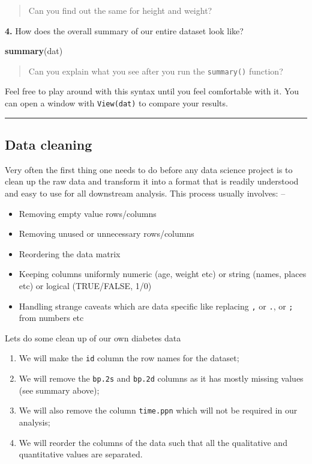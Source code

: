 \documentclass[
]{book}
\newenvironment{Shaded}{\begin{snugshade}}{\end{snugshade}}
\newcommand{\FunctionTok}[1]{\textcolor[rgb]{0.13,0.29,0.53}{\textbf{#1}}}
\newcommand{\NormalTok}[1]{#1}
\providecommand{\tightlist}{%
  \setlength{\itemsep}{0pt}\setlength{\parskip}{0pt}}
\begin{document}
\begin{quote}
Can you find out the same for height and weight?
\end{quote}

\textbf{4.} How does the overall summary of our entire dataset look like?

\begin{Shaded}
\begin{Highlighting}[]
\FunctionTok{summary}\NormalTok{(dat)}
\end{Highlighting}
\end{Shaded}

\begin{quote}
Can you explain what you see after you run the \texttt{summary()} function?
\end{quote}

Feel free to play around with this syntax until you feel comfortable with it.
You can open a window with \texttt{View(dat)} to compare your results.

\begin{center}\rule{0.5\linewidth}{0.5pt}\end{center}

\hypertarget{data-cleaning}{%
\subsection{Data cleaning}\label{data-cleaning}}

Very often the first thing one needs to do before any data science project is to clean up the raw data and transform it into a format that is readily understood and easy to use for all downstream analysis.
This process usually involves: --

\begin{itemize}
\tightlist
\item
  Removing empty value rows/columns
\item
  Removing unused or unnecessary rows/columns
\item
  Reordering the data matrix
\item
  Keeping columns uniformly numeric (age, weight etc) or string (names, places etc) or logical (TRUE/FALSE, 1/0)
\item
  Handling strange caveats which are data specific like replacing \texttt{,} or \texttt{.}, or \texttt{;} from numbers etc
\end{itemize}

Lets do some clean up of our own diabetes data

\begin{enumerate}
\def\labelenumi{\arabic{enumi}.}
\tightlist
\item
  We will make the \texttt{id} column the row names for the dataset;
\item
  We will remove the \texttt{bp.2s} and \texttt{bp.2d} columns as it has mostly missing values (see summary above);
\item
  We will also remove the column \texttt{time.ppn} which will not be required in our analysis;
\item
  We will reorder the columns of the data such that all the qualitative and quantitative values are separated.
\end{enumerate}
\end{document}
